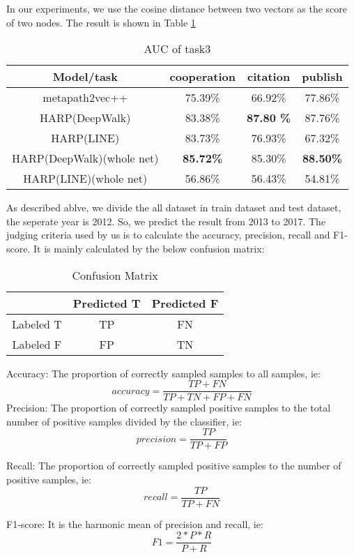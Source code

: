 \documentclass[conference]{IEEEtran}
\begin{document}
In our experiments, we use the cosine distance between two vectors as the score of two nodes. The result is shown in Table \ref{AUC}
\begin{table}[h]
\center
\begin{tabular}{c|c|c|c}
\hline
\hline
\textbf{Model/task} & \textbf{cooperation} & \textbf{citation} & \textbf{publish}\\
\hline
\hline
metapath2vec++ &75.39\%&66.92\%&77.86\%\\
\hline
HARP(DeepWalk)&83.38\%&\textbf{87.80 \%}&87.76\%\\
\hline
HARP(LINE)&83.73\%&76.93\%& 67.32\%\\
\hline
HARP(DeepWalk)(whole net)& \textbf{85.72\%}&85.30\%&\textbf{88.50\%}\\
\hline
HARP(LINE)(whole net)&56.86\%&56.43\%& 54.81\%\\
\hline
\hline
\end{tabular}
\caption{AUC of task3}
\label{AUC}
\end{table}
As described ablve, we divide the all dataset in train dataset and test dataset, the seperate year is 2012. So, we predict the result from 2013 to 2017. The judging criteria used by us is to calculate the accuracy, precision, recall and F1-score. It is mainly calculated by the below confusion matrix:
\renewcommand\arraystretch{1.5}
\begin{table}[htbp]
		\centering
		\begin{tabular}{c|c|c}
			\hline 
			 &Predicted T & Predicted F \\ 
			\hline 
			Labeled T & TP & FN \\ 
			\hline 
			Labeled F &FP&TN\\\hline
		\end{tabular} 
		\caption{Confusion Matrix}
\end{table}

Accuracy: The proportion of correctly sampled samples to all samples, ie:
\[ accuracy = \frac{TP + FN}{TP + TN + FP + FN} \]
Precision: The proportion of correctly sampled positive samples to the total number of positive samples divided by the classifier, ie:
\[ precision = \frac{TP}{TP + FP} \]

Recall: The proportion of correctly sampled positive samples to the number of positive samples, ie:
\[ recall = \frac{TP}{TP + FN} \]

F1-score: It is the harmonic mean of precision and recall, ie:
\[F1 = \frac{2*P*R}{P + R}\]
\end{document}
